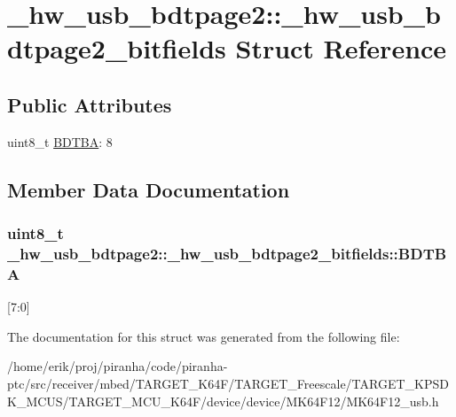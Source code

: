 \hypertarget{struct__hw__usb__bdtpage2_1_1__hw__usb__bdtpage2__bitfields}{}\section{\+\_\+hw\+\_\+usb\+\_\+bdtpage2\+:\+:\+\_\+hw\+\_\+usb\+\_\+bdtpage2\+\_\+bitfields Struct Reference}
\label{struct__hw__usb__bdtpage2_1_1__hw__usb__bdtpage2__bitfields}
\subsection*{Public Attributes}
\begin{DoxyCompactItemize}
\item 
uint8\+\_\+t \hyperlink{struct__hw__usb__bdtpage2_1_1__hw__usb__bdtpage2__bitfields_a89c10d66eeec5a9798b3ae9c85a85224}{B\+D\+T\+BA}\+: 8
\end{DoxyCompactItemize}


\subsection{Member Data Documentation}
\subsubsection[{\texorpdfstring{B\+D\+T\+BA}{BDTBA}}]{\setlength{\rightskip}{0pt plus 5cm}uint8\+\_\+t \+\_\+hw\+\_\+usb\+\_\+bdtpage2\+::\+\_\+hw\+\_\+usb\+\_\+bdtpage2\+\_\+bitfields\+::\+B\+D\+T\+BA}\hypertarget{struct__hw__usb__bdtpage2_1_1__hw__usb__bdtpage2__bitfields_a89c10d66eeec5a9798b3ae9c85a85224}{}\label{struct__hw__usb__bdtpage2_1_1__hw__usb__bdtpage2__bitfields_a89c10d66eeec5a9798b3ae9c85a85224}
\mbox{[}7\+:0\mbox{]} 

The documentation for this struct was generated from the following file\+:\begin{DoxyCompactItemize}
\item 
/home/erik/proj/piranha/code/piranha-\/ptc/src/receiver/mbed/\+T\+A\+R\+G\+E\+T\+\_\+\+K64\+F/\+T\+A\+R\+G\+E\+T\+\_\+\+Freescale/\+T\+A\+R\+G\+E\+T\+\_\+\+K\+P\+S\+D\+K\+\_\+\+M\+C\+U\+S/\+T\+A\+R\+G\+E\+T\+\_\+\+M\+C\+U\+\_\+\+K64\+F/device/device/\+M\+K64\+F12/M\+K64\+F12\+\_\+usb.\+h\end{DoxyCompactItemize}
